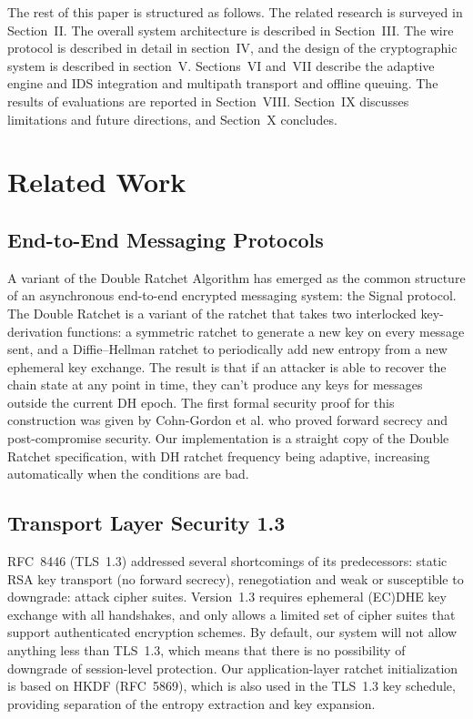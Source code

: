 \documentclass[conference]{IEEEtran}
\begin{document}
The rest of this paper is structured as follows. The related research is surveyed in Section~II. The overall system architecture is described in Section~III. The wire protocol is described in detail in section~IV, and the design of the cryptographic system is described in section~V. Sections~VI and~VII describe the adaptive engine and IDS integration and multipath transport and offline queuing. The results of evaluations are reported in Section~VIII. Section~IX discusses limitations and future directions, and Section~X concludes.

\section{Related Work}

\subsection{End-to-End Messaging Protocols}

A variant of the Double Ratchet Algorithm has emerged as the common structure of an asynchronous end-to-end encrypted messaging system: the Signal \cite{b1} protocol. The Double Ratchet is a variant of the ratchet that takes two interlocked key-derivation functions: a symmetric ratchet to generate a new key on every message sent, and a Diffie--Hellman ratchet to periodically add new entropy from a new ephemeral key exchange. The result is that if an attacker is able to recover the chain state at any point in time, they can't produce any keys for messages outside the current DH epoch. The first formal security proof for this construction was given by Cohn-Gordon et al. \cite{b2} who proved forward secrecy and post-compromise security. Our implementation is a straight copy of the Double Ratchet specification, with DH ratchet frequency being adaptive, increasing automatically when the conditions are bad.

\subsection{Transport Layer Security 1.3}

RFC~8446 (TLS~1.3) \cite{b3} addressed several shortcomings of its predecessors: static RSA key transport (no forward secrecy), renegotiation and weak or susceptible to downgrade: attack cipher suites. Version~1.3 requires ephemeral (EC)DHE key exchange with all handshakes, and only allows a limited set of cipher suites that support authenticated encryption schemes. By default, our system will not allow anything less than TLS~1.3, which means that there is no possibility of downgrade of session-level protection. Our application-layer ratchet initialization is based on HKDF \cite{b4} (RFC~5869), which is also used in the TLS~1.3 key schedule, providing separation of the entropy extraction and key expansion.
\end{document}
